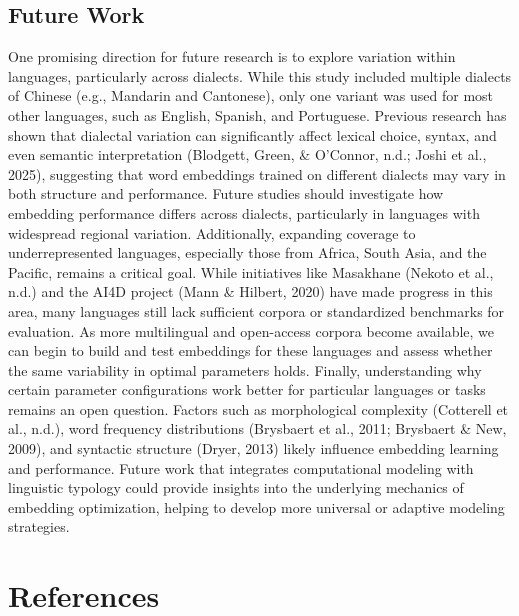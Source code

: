 \documentclass[
  man]{apa6}
\begin{document}
\subsection{Future Work}\label{future-work}

One promising direction for future research is to explore variation within languages, particularly across dialects. While this study included multiple dialects of Chinese (e.g., Mandarin and Cantonese), only one variant was used for most other languages, such as English, Spanish, and Portuguese. Previous research has shown that dialectal variation can significantly affect lexical choice, syntax, and even semantic interpretation (Blodgett, Green, \& O'Connor, n.d.; Joshi et al., 2025), suggesting that word embeddings trained on different dialects may vary in both structure and performance. Future studies should investigate how embedding performance differs across dialects, particularly in languages with widespread regional variation. Additionally, expanding coverage to underrepresented languages, especially those from Africa, South Asia, and the Pacific, remains a critical goal. While initiatives like Masakhane (Nekoto et al., n.d.) and the AI4D project (Mann \& Hilbert, 2020) have made progress in this area, many languages still lack sufficient corpora or standardized benchmarks for evaluation. As more multilingual and open-access corpora become available, we can begin to build and test embeddings for these languages and assess whether the same variability in optimal parameters holds. Finally, understanding why certain parameter configurations work better for particular languages or tasks remains an open question. Factors such as morphological complexity (Cotterell et al., n.d.), word frequency distributions (Brysbaert et al., 2011; Brysbaert \& New, 2009), and syntactic structure (Dryer, 2013) likely influence embedding learning and performance. Future work that integrates computational modeling with linguistic typology could provide insights into the underlying mechanics of embedding optimization, helping to develop more universal or adaptive modeling strategies.

\newpage

\section{References}\label{references}
\end{document}
